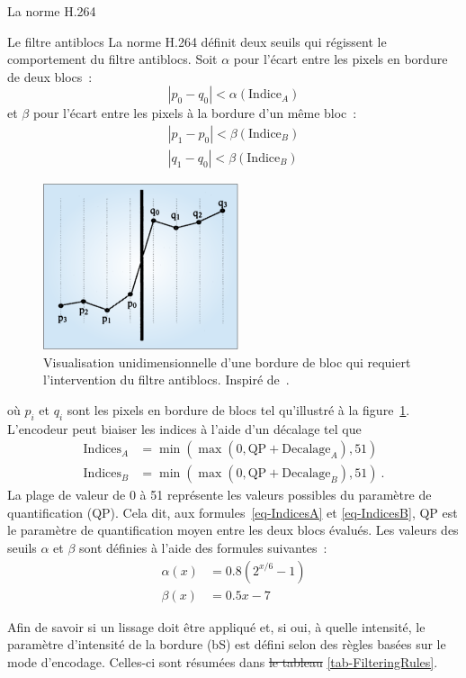 \documentclass[letterpaper, twoside, 12pt,memoire]{thETS}
\providecommand{\DIFadd}[1]{{\protect\color{blue}\uwave{#1}}} %
\providecommand{\DIFdel}[1]{{\protect\color{red}\sout{#1}}}                      %
\providecommand{\DIFaddbegin}{} %
\providecommand{\DIFaddend}{} %
\providecommand{\DIFdelbegin}{} %
\providecommand{\DIFdelend}{} %
\begin{document}
\begin{chapter}{La norme H.264}
\begin{section}{Le filtre antiblocs}
La norme H.264 définit deux seuils qui régissent le comportement du filtre
antiblocs. Soit $\alpha$ pour l'écart entre les pixels en bordure de deux
blocs~:
\begin{equation}
\left| p_0 - q_0 \right| < \alpha(\text{Indice}_A)
\end{equation}
et $\beta$ pour l'écart entre les pixels à la bordure d'un même bloc~:
\begin{align}
\left| p_1 - p_0 \right| < \beta(\text{Indice}_B)\\
\left| q_1 - q_0 \right| < \beta(\text{Indice}_B)
\end{align}
\begin{figure}[htb]
\centering
\includegraphics[scale=0.65]{images/BlockyEdge.png}
\caption{Visualisation unidimensionnelle d'une bordure de bloc qui requiert
l'intervention du filtre antiblocs. Inspiré de~\citep{list2003}.}
\label{fig-BlockyEdge}
\end{figure}
où $p_i$ et $q_i$ sont les pixels en bordure de blocs tel qu'illustré à la
figure~\ref{fig-BlockyEdge}. L'encodeur peut biaiser les indices à l'aide
d'un décalage tel que
\begin{align}
\label{eq-IndicesA}
\text{Indices}_A &= \min(\max(0,\text{QP}+\text{Decalage}_A), 51)\\
\label{eq-IndicesB}
\text{Indices}_B &= \min(\max(0,\text{QP}+\text{Decalage}_B), 51)\:.
\end{align}
La plage de valeur de 0 à 51 représente les valeurs possibles du paramètre de
quantification (QP). Cela dit, aux formules~\ref{eq-IndicesA} et
\ref{eq-IndicesB}, QP est le paramètre de quantification moyen entre les deux
blocs évalués. Les valeurs des seuils $\alpha$ et $\beta$ sont définies à l'aide
des formules suivantes~:
\begin{align}
\alpha(x) &= 0.8(2^{x/6}-1)\\
\beta(x) &= 0.5x-7
\end{align}

Afin de savoir si un lissage doit être appliqué et, si oui, à quelle
intensité, le paramètre d'intensité de la bordure (bS) est défini selon des
règles basées sur le mode d'encodage. Celles-ci sont résumées dans \DIFdelbegin \DIFdel{le tableau
}\DIFdelend \DIFaddbegin \DIFadd{la table
}\DIFaddend \ref{tab-FilteringRules}.


\end{section}
\end{chapter}
\end{document}
